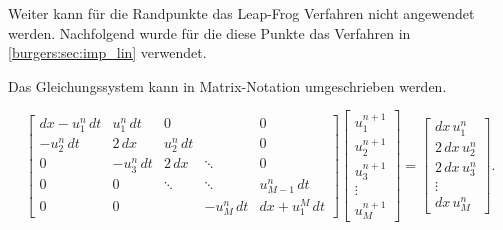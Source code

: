 
Weiter kann f\"ur die Randpunkte das Leap-Frog Verfahren nicht angewendet werden.
Nachfolgend wurde f\"ur die diese Punkte das Verfahren in \ref{burgers:sec:imp_lin} verwendet.

Das Gleichungssystem kann in Matrix-Notation umgeschrieben werden.

\begin{equation}
\left[{\begin{matrix}
{dx- u_{1}^{n}\, dt}&{ u_{1}^{n} \, dt}&{0}&{}&{0}\\[5pt]
{-u_{2}^{n} \, dt}&{ 2 \, dx}&{ u_{2}^{n} \, dt}&{}&{0}\\[5pt]
{0}&{-u_{3}^{n} \, dt}&{ 2 \, dx}&\ddots &{0}\\[5pt]
{0}&{0}&\ddots &\ddots &{ u_{M-1}^{n} \, dt}\\[5pt]
{0}&{0}&{}&{-u_{M}^{n} \, dt}&{dx + u_{1}^{M}\, dt}
\end{matrix}}
\right]\left[{\begin{matrix}
{ u_{1}^{n+1}}\\[5pt]
{ u_{2}^{n+1}}\\[5pt]
{ u_{3}^{n+1}}\\[5pt]
\vdots \\[5pt]
{ u_{M}^{n+1}}
\end{matrix}}\right]
=\left[{\begin{matrix}
{dx \, u_{1}^{n}}\\[5pt]
{ 2 \, dx \, u_{2}^{n}}\\[5pt]
{ 2 \, dx \, u_{3}^{n}}\\[5pt]
\vdots \\[5pt]
{dx \, u_{M}^{n}}
\end{matrix}}\right].
  \end{equation}

